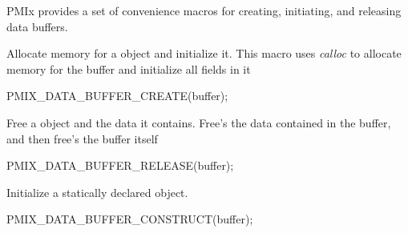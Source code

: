 \ac{PMIx} provides a set of convenience macros for creating, initiating, and releasing data buffers.


Allocate memory for a  object and initialize it.
This macro uses \textit{calloc} to allocate memory for the buffer and initialize all fields in it

\cspecificstart
\begin{codepar}
PMIX_DATA_BUFFER_CREATE(buffer);
\end{codepar}
\cspecificend

\begin{arglist}
\end{arglist}


Free a  object and the data it contains.
Free's the data contained in the buffer, and then free's the buffer itself

\cspecificstart
\begin{codepar}
PMIX_DATA_BUFFER_RELEASE(buffer);
\end{codepar}
\cspecificend

\begin{arglist}
\end{arglist}



Initialize a statically declared  object.

\cspecificstart
\begin{codepar}
PMIX_DATA_BUFFER_CONSTRUCT(buffer);
\end{codepar}
\cspecificend

\begin{arglist}
\end{arglist}



